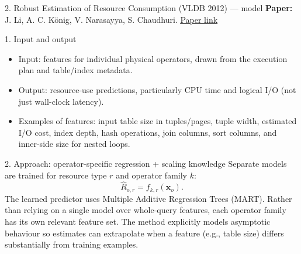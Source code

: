 \documentclass[aspectratio=169,10pt]{beamer}
\newcommand{\paperlink}[2]{\href{#1}{\textcolor{WayangTeal}{\underline{#2}}}}
\begin{document}
\begin{frame}[shrink=10]{2. Robust Estimation of Resource Consumption (VLDB 2012) — model}
\small
\textbf{Paper:} J. Li, A. C. König, V. Narasayya, S. Chaudhuri.
\hfill\paperlink{https://doi.org/10.14778/2350229.2350269}{Paper link}

\begin{block}{1. Input and output}
\begin{itemize}\setlength\itemsep{1pt}
  \item Input: features for individual physical operators, drawn from the execution plan and table/index metadata.
  \item Output: resource-use predictions, particularly CPU time and logical I/O (not just wall-clock latency).
  \item Examples of features: input table size in tuples/pages, tuple width, estimated I/O cost, index depth, hash operations, join columns, sort columns, and inner-side size for nested loops.
\end{itemize}
\end{block}

\begin{block}{2. Approach: operator-specific regression + scaling knowledge}
Separate models are trained for resource type $r$ and operator family $k$:
\[
  \widehat{R}_{o,r}=f_{k,r}(\mathbf x_o).
\]
The learned predictor uses Multiple Additive Regression Trees (MART). Rather than relying on a single model over whole-query features, each operator family has its own relevant feature set. The method explicitly models asymptotic behaviour so estimates can extrapolate when a feature (e.g., table size) differs substantially from training examples.
\end{block}
\end{frame}
\end{document}
